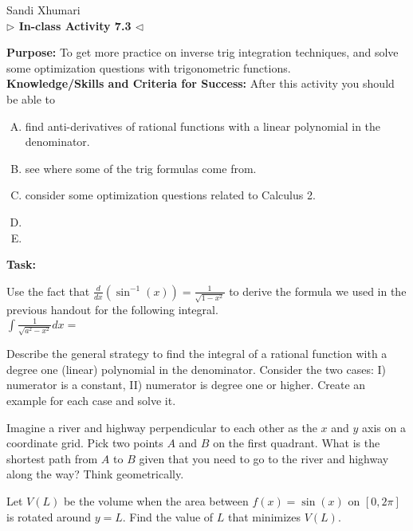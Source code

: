 \documentclass[answers]{exam}
\begin{document}
	\begin{center}
	\hfill Sandi Xhumari \\ \textbf{$\triangleright$ In-class Activity 7.3 $\triangleleft$}\\
\end{center}

\textbf{Purpose:} To get more practice on inverse trig integration techniques, and solve some optimization questions with trigonometric functions.  \\

\textbf{Knowledge/Skills and Criteria for Success:} After this activity you should be able to

\begin{enumerate}[A.]
	\item find anti-derivatives of rational functions with a linear polynomial in the denominator. 
	\item see where some of the trig formulas come from.
	\item consider some optimization questions related to Calculus 2.
	\item
	\item
	
\end{enumerate}

\textbf{Task:}


\begin{questions}


\question Use the fact that $\frac{d}{dx} \left(\sin^{-1}(x)\right) = \frac{1}{\sqrt{1-x^2}}$ to derive the formula we used in the previous handout for the following integral.\\
$\displaystyle \int \frac{1}{\sqrt{a^2-x^2}}dx = $
 
\vspace{2in }

\question Describe the general strategy to find the integral of a rational function with a degree one (linear) polynomial in the denominator. Consider the two cases: I) numerator is a constant, II) numerator is degree one or higher. Create an example for each case and solve it. 

\newpage


\question Imagine a river and highway perpendicular to each other as the $x$ and $y$ axis on a coordinate grid. Pick two points $A$ and $B$ on the first quadrant. What is the shortest path from $A$ to $B$ given that you need to go to the river and highway along the way? Think geometrically.
\vfill


\question Let $V(L)$ be the volume when the area between $f(x)=\sin(x)$  on $[0, 2\pi]$ is rotated around $y=L$.  Find the value of $L$ that minimizes $V(L)$.

\vfill



\end{questions}
\end{document}
